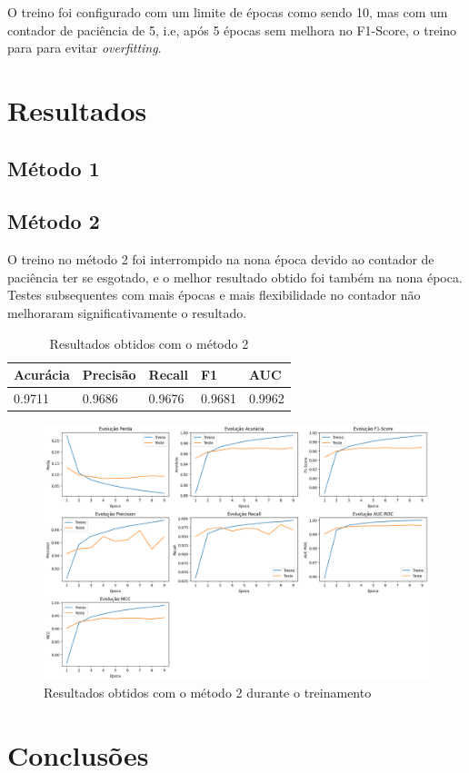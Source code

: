 \documentclass[12pt]{article}
\begin{document}
O treino foi configurado com um limite de épocas como sendo 10, mas com um contador de paciência de 5, i.e, após 5 épocas sem melhora no F1-Score, o treino para para evitar \textit{overfitting}.

\section{Resultados}

\subsection{Método 1}

\subsection{Método 2}

O treino no método 2 foi interrompido na nona época devido ao contador de paciência ter se esgotado, e o melhor resultado obtido foi também na nona época. Testes subsequentes com mais épocas e mais flexibilidade no contador não melhoraram significativamente o resultado.

\begin{table}[H]
	\centering
	\begin{tabular}{|l|l|l|l|l|}
		\hline
		Acurácia & Precisão & Recall & F1 & AUC \\
		\hline
		0.9711  & 0.9686 & 0.9676 & 0.9681 & 0.9962 \\
		\hline
	\end{tabular}
	\label{tab:resultados_m2}
	\caption{Resultados obtidos com o método 2}
\end{table}

\pagebreak
\begin{landscape}
\begin{figure}[H]
	\centering
	\includegraphics[width=0.85\linewidth]{imagens/resultados_metodo_2.png}
	\caption{Resultados obtidos com o método 2 durante o treinamento}
	\label{fig:resultados_m2}
\end{figure}
\end{landscape}

\section{Conclusões}



\end{document}
